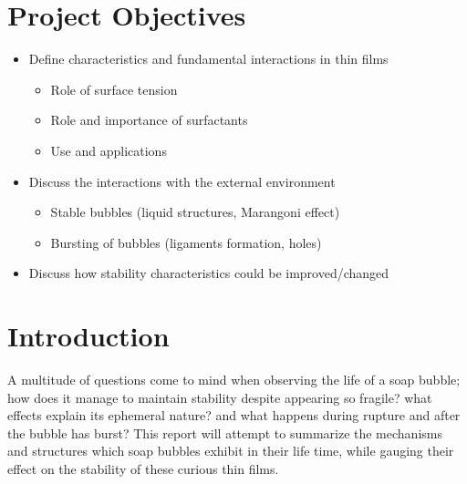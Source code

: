 \documentclass[a4paper,12pt]{article}
\numberwithin{equation}{section}
\numberwithin{figure}{section}
\numberwithin{table}{section}
\begin{document}
\setcounter{page}{2}
\newpage
\section*{Project Objectives}

\begin{itemize}
    \item Define characteristics and fundamental interactions in thin films
    \begin{itemize}
        \item Role of surface tension
		\item Role and importance of surfactants
		\item Use and applications
    \end{itemize}
    \item Discuss the interactions with the external environment
    \begin{itemize}
        \item Stable bubbles (liquid structures, Marangoni effect)
		\item Bursting of bubbles (ligaments formation, holes)
    \end{itemize}
     \item Discuss how stability characteristics could be improved/changed
\end{itemize}

\newpage
\tableofcontents


\newpage
\clearpage{}
\section{Introduction}

A multitude of questions come to mind when observing the life of a soap bubble; how does it manage to maintain stability despite appearing so fragile? what effects explain its ephemeral nature? and what happens during rupture and after the bubble has burst? This report will attempt to summarize the mechanisms and structures which soap bubbles exhibit in their life time, while gauging their effect on the stability of these curious thin films.
\end{document}

